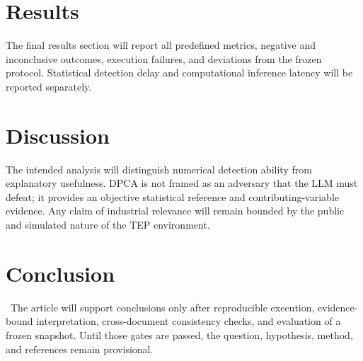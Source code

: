 \documentclass[a4paper,12pt]{article}
\begin{document}
\ResearchHypothesisEN

\section{Results}
\ResultsStatusEN

The final results section will report all predefined metrics, negative and inconclusive outcomes, execution failures, and deviations from the frozen protocol. Statistical detection delay and computational inference latency will be reported separately.

\section{Discussion}
\ResearchLimitationsEN

The intended analysis will distinguish numerical detection ability from explanatory usefulness. DPCA is not framed as an adversary that the LLM must defeat; it provides an objective statistical reference and contributing-variable evidence. Any claim of industrial relevance will remain bounded by the public and simulated nature of the TEP environment.

\section{Conclusion}
\ResearchContributionEN\ The article will support conclusions only after reproducible execution, evidence-bound interpretation, cross-document consistency checks, and evaluation of a frozen snapshot. Until those gates are passed, the question, hypothesis, method, and references remain provisional.

\printbibliography
\end{document}
